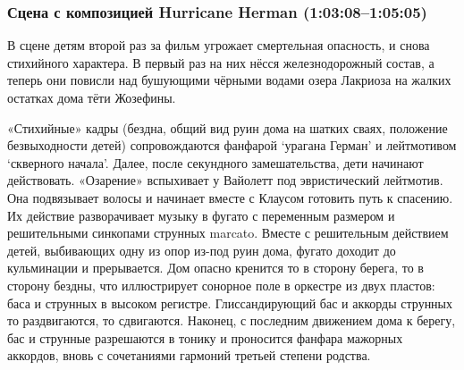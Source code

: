 \subsubsection{Сцена с композицией Hurricane Herman (1:03:08--1:05:05)}\label{ux441ux446ux435ux43dux430-ux441-ux43aux43eux43cux43fux43eux437ux438ux446ux438ux435ux439-hurricane-herman-1030810505}

В сцене детям второй раз за фильм угрожает смертельная опасность, и снова стихийного характера.
В первый раз на них нёсся железнодорожный состав, а теперь они повисли над бушующими чёрными водами озера Лакриоза на жалких остатках дома тёти Жозефины.

«Стихийные» кадры (бездна, общий вид руин дома на шатких сваях, положение безвыходности детей) сопровождаются фанфарой `урагана Герман' и лейтмотивом `скверного начала'.
Далее, после секундного замешательства, дети начинают действовать.
«Озарение» вспыхивает у Вайолетт под эвристический лейтмотив.
Она подвязывает волосы и начинает вместе с Клаусом готовить путь к спасению.
Их действие разворачивает музыку в фугато с переменным размером и решительными синкопами струнных marcato.
Вместе с решительным действием детей, выбивающих одну из опор из-под руин дома, фугато доходит до кульминации и прерывается.
Дом опасно кренится то в сторону берега, то в сторону бездны, что иллюстрирует сонорное поле в оркестре из двух пластов: баса и струнных в высоком регистре.
Глиссандирующий бас и аккорды струнных то раздвигаются, то сдвигаются.
Наконец, с последним движением дома к берегу, бас и струнные разрешаются в тонику и проносится фанфара мажорных аккордов, вновь с сочетаниями гармоний третьей степени родства.

